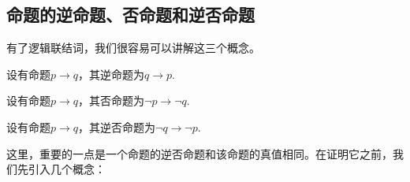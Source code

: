 \subsection{命题的逆命题、否命题和逆否命题}
有了逻辑联结词，我们很容易可以讲解这三个概念。 
\begin{definition}[逆命题]
    设有命题$p \to q$，其逆命题为$q \to p$.
\end{definition}
\begin{definition}[否命题]
    设有命题$p \to q$，其否命题为$\neg p \to \neg q$.
\end{definition}
\begin{definition}[逆否命题]
    设有命题$p \to q$，其逆否命题为$\neg q \to \neg p$.
\end{definition}
这里，重要的一点是一个命题的逆否命题和该命题的真值相同。在证明它之前，我们先引入几个概念：



